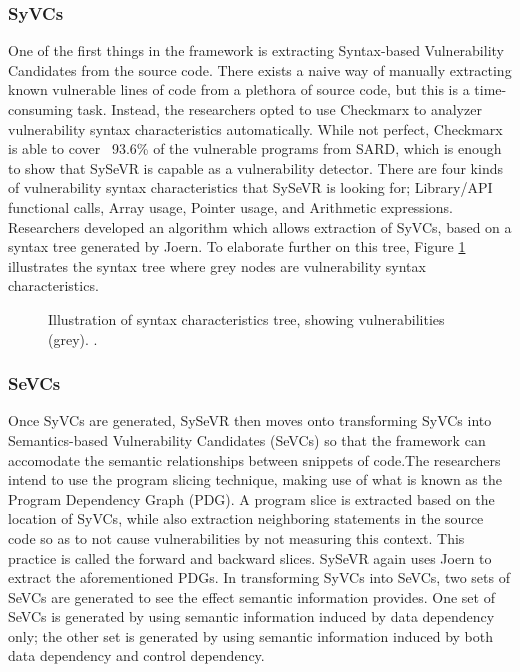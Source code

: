 \documentclass[12pt,twocolumn,letterpaper]{article}
\begin{document}
\subsubsection{SyVCs}
One of the first things in the framework is extracting Syntax-based Vulnerability Candidates from the source code.
There exists a naive way of manually extracting known vulnerable lines of code from a plethora of source code, but this is a time-consuming task.
Instead, the researchers opted to use Checkmarx to analyzer vulnerability syntax characteristics automatically. While not perfect, Checkmarx is able to cover
~93.6\% of the vulnerable programs from SARD, which is enough to show that SySeVR is capable as a vulnerability detector.
There are four kinds of vulnerability syntax characteristics that SySeVR is looking for; Library/API functional calls, Array usage, Pointer usage, and Arithmetic expressions.
Researchers developed an algorithm which allows extraction of SyVCs, based on a syntax tree generated by Joern. To elaborate further on this tree,
Figure \ref{fig:sys-2} illustrates the syntax tree where grey nodes are vulnerability syntax characteristics.


\begin{figure}[h!]
    \centering
    \caption{Illustration of syntax characteristics tree, showing vulnerabilities (grey). \cite{Li22}.}
    \label{fig:sys-2}
\end{figure}

\subsubsection{SeVCs}
Once SyVCs are generated, SySeVR then moves onto transforming SyVCs into Semantics-based Vulnerability Candidates (SeVCs) so that the framework can accomodate the
semantic relationships between snippets of code.The researchers intend to use the program slicing technique, making use of what is known as the
Program Dependency Graph (PDG). A program slice is extracted based on the location of SyVCs, while also extraction neighboring statements in the source code so as to not cause
vulnerabilities by not measuring this context. This practice is called the forward and backward slices. SySeVR again uses Joern to extract the aforementioned PDGs.
In transforming SyVCs into SeVCs, two sets of SeVCs are generated to see the effect semantic information provides. One set of SeVCs is generated
by using semantic information induced by data dependency only; the other set is generated by using semantic information induced by both
data dependency and control dependency.
\end{document}
